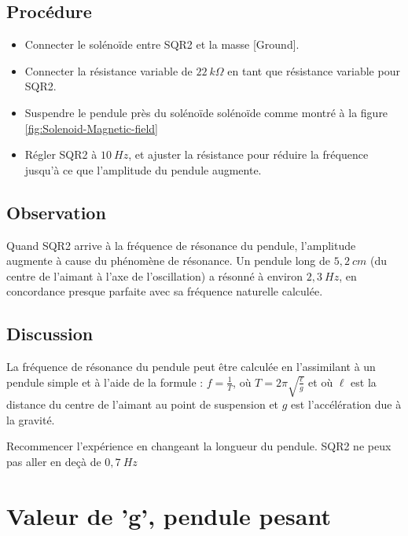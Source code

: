 \documentclass{book}
\begin{document}
\subsection{Procédure}


\begin{itemize}
  \item Connecter le solénoïde entre SQR2 et la masse [Ground].
  \item Connecter la résistance variable de $22\ k\Omega$  en tant que résistance variable pour SQR2.
  \item Suspendre le pendule près du solénoïde solénoïde comme montré à la figure  \ref{fig:Solenoid-Magnetic-field}
  \item Régler SQR2 à $10\ Hz$, et ajuster la résistance pour réduire la fréquence jusqu'à ce que l'amplitude du pendule augmente.
\end{itemize}

\subsection{Observation}


Quand SQR2 arrive à la fréquence de résonance du pendule, l'amplitude augmente à cause du phénomène de résonance. Un pendule long de $5,2\ cm$ (du centre de l'aimant à l'axe de l'oscillation) a résonné à environ $2,3\ Hz$, en concordance presque parfaite avec sa fréquence naturelle calculée.

\subsection{Discussion}


La fréquence de résonance du pendule peut être calculée en l'assimilant à un pendule simple et à l'aide de la formule :
$f=\frac{1}{T}$, où $T=2\pi\sqrt{\frac{\ell}{g} }$ et où $\ell$  est la distance du centre de l'aimant au point de suspension et $g$  est l'accélération due à la gravité.



Recommencer l'expérience en changeant la longueur du pendule. SQR2 ne peux pas aller en deçà de $0,7\ Hz$







\section{Valeur de 'g', pendule pesant}
\end{document}
